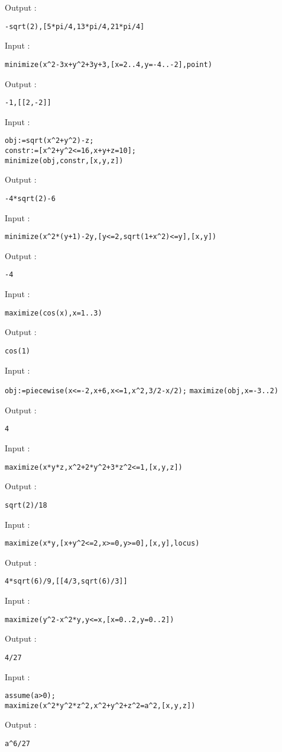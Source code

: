 \documentclass[a4paper,11pt]{book}
\begin{document}
Output :
\begin{center}
{\tt -sqrt(2),[5*pi/4,13*pi/4,21*pi/4]}
\end{center}
Input :
\begin{center}
{\tt minimize(x\verb|^|2-3x+y\verb|^|2+3y+3,[x=2..4,y=-4..-2],point)}
\end{center}
Output :
\begin{center}
{\tt -1,[[2,-2]]}
\end{center}
Input :
\begin{center}
{\tt obj:=sqrt(x\verb|^|2+y\verb|^|2)-z;}\\
{\tt constr:=[x\verb|^|2+y\verb|^|2<=16,x+y+z=10];}\\
{\tt minimize(obj,constr,[x,y,z])}
\end{center}
Output :
\begin{center}
{\tt -4*sqrt(2)-6}
\end{center}
Input :
\begin{center}
{\tt minimize(x\verb|^|2*(y+1)-2y,[y<=2,sqrt(1+x\verb|^|2)<=y],[x,y])}
\end{center}
Output :
\begin{center}
{\tt -4}
\end{center}
Input :
\begin{center}
{\tt maximize(cos(x),x=1..3)}
\end{center}
Output :
\begin{center}
{\tt cos(1)}
\end{center}
Input :
\begin{center}
{\tt obj:=piecewise(x<=-2,x+6,x<=1,x\verb|^|2,3/2-x/2);}
{\tt maximize(obj,x=-3..2)}
\end{center}
Output :
\begin{center}
{\tt 4}
\end{center}
Input :
\begin{center}
{\tt maximize(x*y*z,x\verb|^|2+2*y\verb|^|2+3*z\verb|^|2<=1,[x,y,z])}
\end{center}
Output :
\begin{center}
{\tt sqrt(2)/18}
\end{center}
Input :
\begin{center}
{\tt maximize(x*y,[x+y\verb|^|2<=2,x>=0,y>=0],[x,y],locus)}
\end{center}
Output :
\begin{center}
{\tt 4*sqrt(6)/9,[[4/3,sqrt(6)/3]]}
\end{center}
Input :
\begin{center}
{\tt maximize(y\verb|^|2-x\verb|^|2*y,y<=x,[x=0..2,y=0..2])}
\end{center}
Output :
\begin{center}
{\tt 4/27}
\end{center}
Input :
\begin{center}
{\tt assume(a>0);}\\
{\tt maximize(x\verb|^|2*y\verb|^|2*z\verb|^|2,x\verb|^|2+y\verb|^|2+z\verb|^|2=a\verb|^|2,[x,y,z])}
\end{center}
Output :
\begin{center}
{\tt a\verb|^|6/27}
\end{center}
\end{document}
